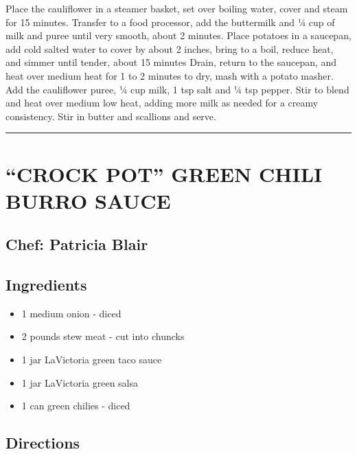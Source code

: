 \documentclass[
]{book}
\providecommand{\tightlist}{%
  \setlength{\itemsep}{0pt}\setlength{\parskip}{0pt}}
\begin{document}
Place the cauliflower in a steamer basket, set over boiling water,
cover and steam for 15 minutes. Transfer to a food processor, add
the buttermilk and ¼ cup of milk and puree until very smooth, about 2
minutes. Place potatoes in a saucepan, add cold salted water to cover
by about 2 inches, bring to a boil, reduce heat, and simmer until tender,
about 15 minutes Drain, return to the saucepan, and heat over
medium heat for 1 to 2 minutes to dry, mash with a potato masher.
Add the cauliflower puree, ¼ cup milk, 1 tsp salt and ¼ tsp pepper.
Stir to blend and heat over medium low heat, adding more milk as
needed for a creamy consistency. Stir in butter and scallions and serve.

\begin{center}\rule{0.5\linewidth}{0.5pt}\end{center}

\hypertarget{crock-pot-green-chili-burro-sauce}{%
\section*{``CROCK POT'' GREEN CHILI BURRO SAUCE}\label{crock-pot-green-chili-burro-sauce}}


\hypertarget{chef-patricia-blair-7}{%
\subsection*{Chef: Patricia Blair}\label{chef-patricia-blair-7}}


\hypertarget{ingredients-29}{%
\subsection*{Ingredients}\label{ingredients-29}}


\begin{itemize}
\tightlist
\item
  1 medium onion - diced
\item
  2 pounds stew meat - cut into chuncks
\item
  1 jar LaVictoria green taco sauce
\item
  1 jar LaVictoria green salsa
\item
  1 can green chilies - diced
\end{itemize}

\hypertarget{directions-29}{%
\subsection*{Directions}\label{directions-29}}
\end{document}
